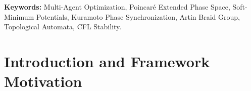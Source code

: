 \documentclass[11pt,a4paper,reqno]{article}
\theoremstyle{plain}
\theoremstyle{definition}
\theoremstyle{remark}
\numberwithin{equation}{section}
\begin{document}
\begin{abstract}
\begin{enumerate}
\end{enumerate}
Extensive numerical experiments in double precision (FP64) verify shadow Hamiltonian conservation ($\Delta H / H_0 < 10^{-8}$) and establish an order-of-magnitude reduction in constraint violation during close multi-agent maneuvers compared to rigid-coupling formulations.
\end{abstract}

\vspace{1ex}
\noindent \textbf{Keywords:} Multi-Agent Optimization, Poincaré Extended Phase Space, Soft-Minimum Potentials, Kuramoto Phase Synchronization, Artin Braid Group, Topological Automata, CFL Stability.

\newpage
\tableofcontents
\newpage

\section{Introduction and Framework Motivation}
\end{document}
